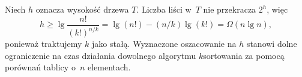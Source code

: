 Niech $h$ oznacza wysokość drzewa $T$.
Liczba liści w~$T$ nie przekracza $2^h$, więc
\[
    h \ge \lg\frac{n!}{(k!)^{n/k}} = \lg(n!)-(n/k)\lg(k!) = \Omega(n\lg n),
\]
ponieważ traktujemy $k$ jako stałą.
Wyznaczone oszacowanie na $h$ stanowi dolne ograniczenie na czas działania dowolnego algorytmu $k$\nbhyphen sortowania za pomocą porównań tablicy o~$n$ elementach.
